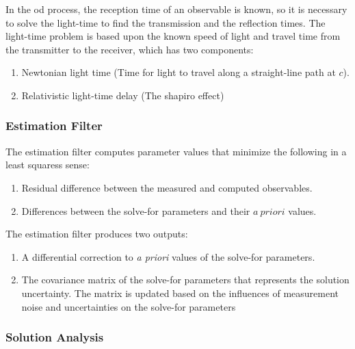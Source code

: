 \documentclass{article}
\theoremstyle{mystyle}
\begin{document}
In the \gls{od} process, the reception time of an observable is known, so it is necessary to solve the light-time to find the transmission and the reflection times. The light-time
problem is based upon the known speed of light and travel time from the transmitter to the receiver, which has two components:

\begin{enumerate}[itemsep=0pt]
    \item Newtonian light time (Time for light to travel along a straight-line path at $c$).
    \item Relativistic light-time delay (The \gls{shapiro effect})
\end{enumerate}

\subsubsection{\footnotesize Estimation Filter}

The estimation filter computes parameter values that minimize the following in a \glspl{least squares} sense:
\begin{enumerate}[itemsep=0pt]
\item Residual difference between the measured and computed observables.
\item Differences between the solve-for parameters and their $a\ priori$ values.
\end{enumerate}

The estimation filter produces two outputs:

\begin{enumerate}[itemsep=0pt]
    \item A differential correction to \textit{a priori} values of the \gls{solve-for parameters}.
    \item The \gls{covariance matrix} of the \gls{solve-for parameters} that represents the solution uncertainty. The matrix is updated based on the influences of measurement noise and  uncertainties on the \gls{solve-for parameters}
\end{enumerate}

\subsubsection{\footnotesize Solution Analysis}
\end{document}

